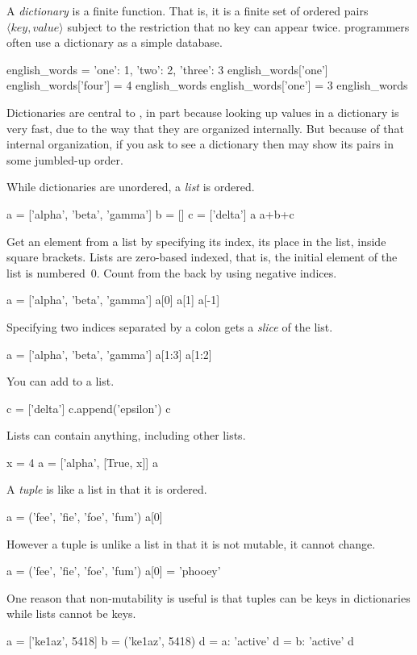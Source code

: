 A \python{} \textit{dictionary} is a finite function.
That is, it is a finite
set of ordered pairs $\langle\textit{key},\textit{value}\rangle$ subject 
to the restriction that no key can appear twice.
\python{} programmers often use a dictionary as a simple database.
\begin{pythonconsole}
english_words = {'one': 1, 'two': 2, 'three': 3}
english_words['one']
english_words['four'] = 4  
english_words
english_words['one'] = 3
english_words
\end{pythonconsole}
\noindent 
Dictionaries are central to \python, in part because looking up values 
in a dictionary is very fast, due to the way that they are 
organized internally.
But because of that internal organization,
if you ask to see a dictionary then \python{} may show its pairs in 
some jumbled-up order.

While dictionaries are unordered, a \textit{list} is ordered.
\begin{pythonconsole}
a = ['alpha', 'beta', 'gamma']
b = []
c = ['delta']
a
a+b+c
\end{pythonconsole}
\noindent
Get an element from a list by specifying its index, its place in the list,
inside square brackets.
Lists are zero-based indexed, that is, the initial element of the
list is numbered~$0$.
Count from the back by using negative indices.
\begin{pythonconsole}
a = ['alpha', 'beta', 'gamma']
a[0]
a[1]
a[-1]
\end{pythonconsole}
\noindent
Specifying two indices separated by a colon gets a \textit{slice} 
of the list. 
\begin{pythonconsole} 
a = ['alpha', 'beta', 'gamma']
a[1:3]
a[1:2]
\end{pythonconsole}
\noindent
You can add to a list.
\begin{pythonconsole}
c = ['delta']
c.append('epsilon')
c
\end{pythonconsole}
\noindent
Lists can contain anything, including other lists.
\begin{pythonconsole}
x = 4
a = ['alpha', [True, x]]
a
\end{pythonconsole}

A \textit{tuple} is like a list in that it is ordered.
\begin{pythonconsole}
a = ('fee', 'fie', 'foe', 'fum')
a[0]
\end{pythonconsole}
\noindent
However a tuple is unlike a list 
in that it is not mutable, it cannot change.
\begin{pythonconsole}
a = ('fee', 'fie', 'foe', 'fum')
a[0] = 'phooey'
\end{pythonconsole}
\noindent
One reason that non-mutability is useful is that 
tuples can be keys in dictionaries while lists cannot be keys.
\begin{pythonconsole}
a = ['ke1az', 5418]
b = ('ke1az', 5418)
d = {a: 'active'}
d = {b: 'active'}
d
\end{pythonconsole}

